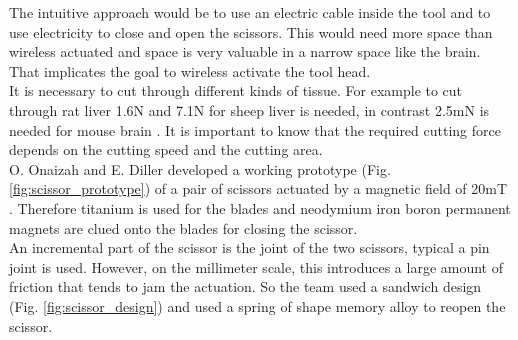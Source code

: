 The intuitive approach would be to use an electric cable inside the tool and to use electricity to close and open the scissors. This would need more space than wireless actuated and space is very valuable in a narrow space like the brain. That implicates the goal to  wireless activate the tool head. \\
It is necessary to cut through different kinds of tissue. For example to cut through rat liver 1.6N and 7.1N for sheep liver is needed, in contrast 2.5mN is needed for mouse brain \cite{ScissorActuation}. It is important to know that the required cutting force depends on the cutting speed and the cutting area. \\
O. Onaizah and E. Diller developed a working prototype (Fig. \ref{fig:scissor_prototype}) of a pair of scissors actuated by a magnetic field of 20mT \cite{ScissorActuation}. Therefore titanium is used for the blades and neodymium iron boron permanent magnets are clued onto the blades for closing the scissor. \\
An incremental part of the scissor is the joint of the two scissors, typical a pin joint is used. \grqq However, on the millimeter scale, this introduces a large amount of friction that tends to jam the actuation\grqq \cite{ScissorActuation}. So the team used a sandwich design (Fig. \ref{fig:scissor_design}) and used a spring of shape memory alloy to reopen the scissor. 
